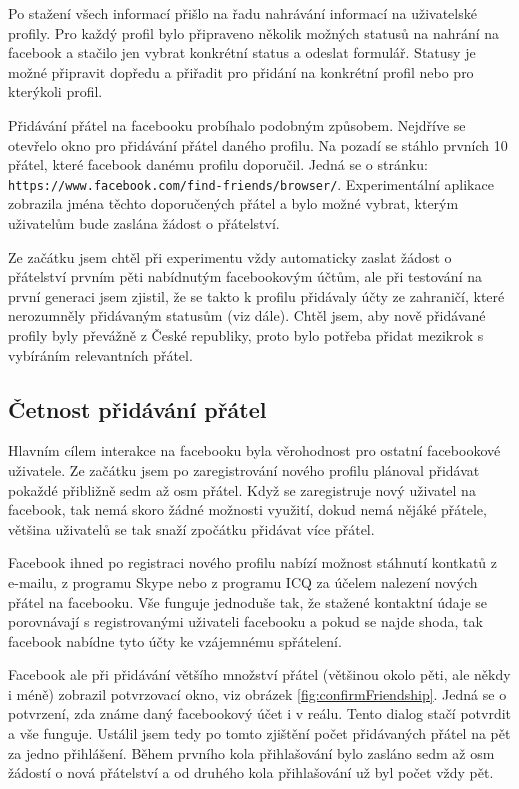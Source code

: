 \documentclass[thesis=M,czech]{FITthesis}[2013/05/10]
\begin{document}
Po stažení všech informací přišlo na řadu nahrávání informací na uživatelské profily. Pro každý profil bylo připraveno několik možných statusů na nahrání na facebook a stačilo jen vybrat konkrétní status a odeslat formulář. Statusy je možné připravit dopředu a přiřadit pro přidání na konkrétní profil nebo pro kterýkoli profil.

Přidávání přátel na facebooku probíhalo podobným způsobem. Nejdříve se otevřelo okno pro přidávání přátel daného profilu. Na pozadí se stáhlo prvních 10 přátel, které facebook danému profilu doporučil. Jedná se o stránku: \verb|https://www.facebook.com/find-friends/browser/|. Experimentální aplikace zobrazila jména těchto doporučených přátel a bylo možné vybrat, kterým uživatelům bude zaslána žádost o přátelství. 

Ze začátku jsem chtěl při experimentu vždy automaticky zaslat žádost o přátelství prvním pěti nabídnutým facebookovým účtům, ale při testování na první generaci jsem zjistil, že se takto k profilu přidávaly účty ze zahraničí, které nerozumněly přidávaným statusům (viz dále). Chtěl jsem, aby nově přidávané profily byly převážně z České republiky, proto bylo potřeba přidat mezikrok s vybíráním relevantních přátel.

\subsection{Četnost přidávání přátel}

Hlavním cílem interakce na facebooku byla věrohodnost pro ostatní facebookové uživatele. Ze začátku jsem po zaregistrování nového profilu plánoval přidávat pokaždé přibližně sedm až osm přátel. Když se zaregistruje nový uživatel na facebook, tak nemá skoro žádné možnosti využití, dokud nemá nějáké přátele, většina uživatelů se tak snaží zpočátku přidávat více přátel. 

Facebook ihned po registraci nového profilu nabízí možnost stáhnutí kontkatů z e-mailu, z programu Skype nebo z programu ICQ za účelem nalezení nových přátel na facebooku. Vše funguje jednoduše tak, že stažené kontaktní údaje se porovnávají s registrovanými uživateli facebooku a pokud se najde shoda, tak facebook nabídne tyto účty ke vzájemnému spřátelení.

Facebook ale při přidávání většího množství přátel (většinou okolo pěti, ale někdy i méně) zobrazil potvrzovací okno, viz obrázek \ref{fig:confirmFriendship}. Jedná se o potvrzení, zda známe daný facebookový účet i v reálu. Tento dialog stačí potvrdit a vše funguje. Ustálil jsem tedy po tomto zjištění počet přidávaných přátel na pět za jedno přihlášení. Během prvního kola přihlašování bylo zasláno sedm až osm žádostí o nová přátelství a od druhého kola přihlašování už byl počet vždy pět.
\end{document}
